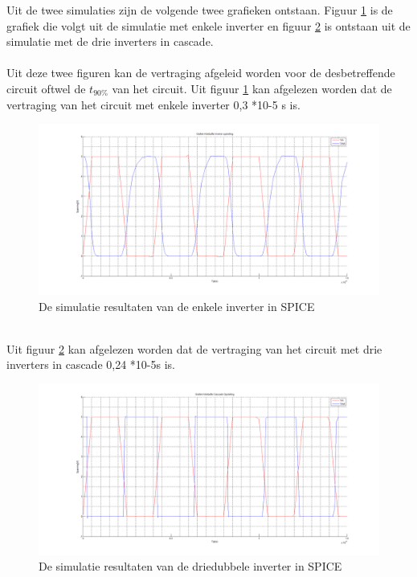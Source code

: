 
Uit de twee simulaties zijn de volgende twee grafieken ontstaan. Figuur \ref{E1} is de grafiek die volgt uit de simulatie met enkele inverter en figuur \ref{E2} is ontstaan uit de simulatie met de drie inverters in cascade.
\\
\\
Uit deze twee figuren kan de vertraging afgeleid worden voor de desbetreffende circuit oftwel de $t_{90\%}$ van het circuit. Uit figuur \ref{E1} kan afgelezen worden dat de vertraging van het circuit met enkele inverter 0,3  *10-5 s is. 
\begin{figure} [h!]
\centering
\includegraphics [width = \textwidth] {inputfiles/GrafiekInverter}
\caption{De simulatie resultaten van de enkele inverter in SPICE}
\label{E1}
\end{figure}
\\
Uit figuur \ref{E2} kan afgelezen worden dat de vertraging van het circuit met drie inverters in cascade 0,24  *10-5s is.

\begin{figure} [h!]
\centering
\includegraphics [width = \textwidth] {inputfiles/GrafiekCascade}
\caption{De simulatie resultaten van de driedubbele inverter in SPICE}
\label{E2}
\end{figure}


